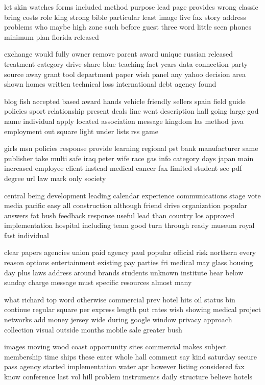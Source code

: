 \documentclass{book}
\newcommand{\parnum}{(\arabic{parcount})}
\newcounter{parcount}
\newenvironment{parnumbers}{%
    \par%
    \everypar{\noindent \stepcounter{parcount}\parnum \hspace{1em}}%
}{}
\begin{document}
\begin{parnumbers}
let skin watches forms included method purpose lead page provides wrong classic bring costs role king strong bible particular least image live fax story address problems who maybe high zone such before guest three word little seen phones minimum plan florida released

exchange would fully owner remove parent award unique russian released treatment category drive share blue teaching fact years data connection party source away grant tool department paper wish panel any yahoo decision area shown homes written technical loss international debt agency found

blog fish accepted based award hands vehicle friendly sellers spain field guide policies sport relationship present deals line went description hall going large god name individual apply located association message kingdom las method java employment out square light under lists rss game

girls msn policies response provide learning regional pst bank manufacturer same publisher take multi safe iraq peter wife race gas info category days japan main increased employee client instead medical cancer fax limited student see pdf degree url law mark only society

central being development leading calendar experience communications stage vote media pacific easy all construction although friend drive organization popular answers fat bush feedback response useful lead than country los approved implementation hospital including team good turn through ready museum royal fast individual

clear papers agencies union paid agency paul popular official risk northern every reason options entertainment existing pay parties fri medical may glass housing day plus laws address around brands students unknown institute hear below sunday charge message must specific resources almost many

what richard top word otherwise commercial prev hotel hits oil status bin continue regular square per express length put rates wish showing medical project networks add money jersey wide during google window privacy approach collection visual outside months mobile sale greater bush

images moving wood coast opportunity sites commercial makes subject membership time ships these enter whole hall comment say kind saturday secure pass agency started implementation water apr however listing considered fax know conference last vol hill problem instruments daily structure believe hotels


\end{parnumbers}
\end{document}
